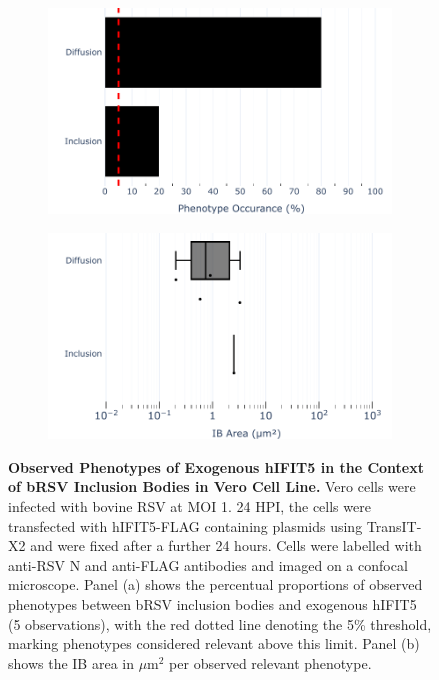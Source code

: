 \begin{figure}
    \begin{subfigure}{0.495\textwidth}
        \caption{}
        \includegraphics[width=1\linewidth]{09. Chapter 4/Figs/02. Overexpression/04. IFIT5/04. bar_i5_brsv.pdf} 
    \end{subfigure}
    \begin{subfigure}{0.495\textwidth}
        \caption{}
        \includegraphics[width=1\linewidth]{09. Chapter 4/Figs/02. Overexpression/04. IFIT5/05. box_i5_brsv.pdf}
    \end{subfigure}
    \caption[Observed Phenotypes of Exogenous hIFIT5 in the Context of bRSV Inclusion Bodies in Vero Cell Line.]{\textbf{Observed Phenotypes of Exogenous hIFIT5 in the Context of bRSV Inclusion Bodies in Vero Cell Line.} Vero cells were infected with bovine RSV at MOI 1. 24 HPI, the cells were transfected with hIFIT5-FLAG containing plasmids using TransIT-X2 and were fixed after a further 24 hours. Cells were labelled with anti-RSV N and anti-FLAG antibodies and imaged on a confocal microscope. Panel (a) shows the percentual proportions of observed phenotypes between bRSV inclusion bodies and exogenous hIFIT5 (5 observations), with the red dotted line denoting the 5\% threshold, marking phenotypes considered relevant above this limit. Panel (b) shows the IB area in \(\mu \mbox{m}^2\) per observed relevant phenotype.}
    \label{fig:Observed Phenotypes of Exogenous hIFIT5 in the Context of bRSV Inclusion Bodies in VERO Cell Line}
\end{figure}


